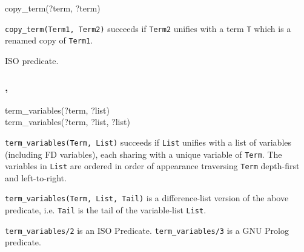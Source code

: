 \begin{TemplatesOneCol}
copy\_term(?term, ?term)

\end{TemplatesOneCol}

\Description

\texttt{copy\_term(Term1, Term2)} succeeds if \texttt{Term2} unifies with a
term \texttt{T} which is a renamed copy of \texttt{Term1}.

\PlErrorsNone

\Portability

ISO predicate.

\subsubsection{,
               }

\label{term_variables/2-3}

\begin{TemplatesOneCol}
term\_variables(?term, ?list)\\
term\_variables(?term, ?list, ?list)\\

\end{TemplatesOneCol}

\Description

\texttt{term\_variables(Term, List)} succeeds if \texttt{List} unifies with a
list of variables (including FD variables), each sharing with a unique
variable of \texttt{Term}. The variables in \texttt{List} are ordered in
order of appearance traversing \texttt{Term} depth-first and left-to-right.

\texttt{term\_variables(Term, List, Tail)} is a difference-list version of
the above predicate, i.e. \texttt{Tail} is the tail of the variable-list
\texttt{List}.

\begin{PlErrors}


\end{PlErrors}


\Portability

\texttt{term\_variables/2} is an ISO Predicate. \texttt{term\_variables/3} is a 
GNU Prolog predicate.

\subsubsection{}

